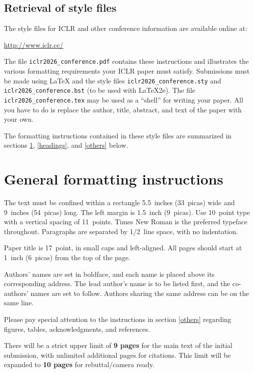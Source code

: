 \documentclass{article} %
\begin{document}
\subsection{Retrieval of style files}

The style files for ICLR and other conference information are available online at:
\begin{center}
   \url{http://www.iclr.cc/}
\end{center}
The file \verb+iclr2026_conference.pdf+ contains these
instructions and illustrates the
various formatting requirements your ICLR paper must satisfy.
Submissions must be made using \LaTeX{} and the style files
\verb+iclr2026_conference.sty+ and \verb+iclr2026_conference.bst+ (to be used with \LaTeX{}2e). The file
\verb+iclr2026_conference.tex+ may be used as a ``shell'' for writing your paper. All you
have to do is replace the author, title, abstract, and text of the paper with
your own.

The formatting instructions contained in these style files are summarized in
sections \ref{gen_inst}, \ref{headings}, and \ref{others} below.

\section{General formatting instructions}
\label{gen_inst}

The text must be confined within a rectangle 5.5~inches (33~picas) wide and
9~inches (54~picas) long. The left margin is 1.5~inch (9~picas).
Use 10~point type with a vertical spacing of 11~points. Times New Roman is the
preferred typeface throughout. Paragraphs are separated by 1/2~line space,
with no indentation.

Paper title is 17~point, in small caps and left-aligned.
All pages should start at 1~inch (6~picas) from the top of the page.

Authors' names are
set in boldface, and each name is placed above its corresponding
address. The lead author's name is to be listed first, and
the co-authors' names are set to follow. Authors sharing the
same address can be on the same line.

Please pay special attention to the instructions in section \ref{others}
regarding figures, tables, acknowledgments, and references.


There will be a strict upper limit of \textbf{9 pages} for the main text of the initial submission, with unlimited additional pages for citations. This limit will be expanded to \textbf{10 pages} for rebuttal/camera ready.
\end{document}
